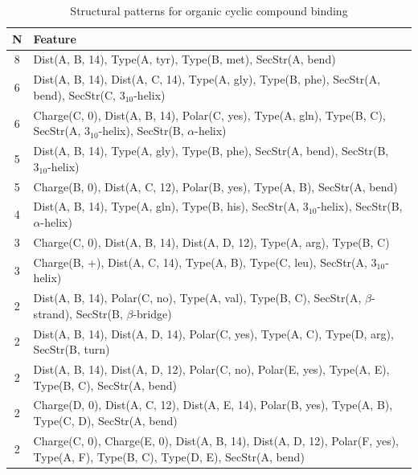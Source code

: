 \documentclass[11pt,twoside,a4paper]{book}
\begin{document}
\begin{table}\begin{tabularx}{\textwidth}{cX}\textbf{N} & \textbf{Feature} \\ \hline  
8 & Dist(A, B, 14),  Type(A, tyr), Type(B, met), SecStr(A, bend)\\ \hline 
6 & Dist(A, B, 14), Dist(A, C, 14),  Type(A, gly), Type(B, phe), SecStr(A, bend), \newline SecStr(C, $3_{10}$-helix)\\ \hline 
6 & Charge(C, 0), Dist(A, B, 14), Polar(C, yes),  Type(A, gln), Type(B, C), \newline SecStr(A, $3_{10}$-helix), SecStr(B, $\alpha$-helix)\\ \hline 
5 & Dist(A, B, 14),  Type(A, gly), Type(B, phe), SecStr(A, bend), SecStr(B, $3_{10}$-helix)\\ \hline 
5 & Charge(B, 0), Dist(A, C, 12), Polar(B, yes),   Type(A, B), SecStr(A, bend)\\ \hline 
4 & Dist(A, B, 14),  Type(A, gln), Type(B, his), SecStr(A, $3_{10}$-helix), SecStr(B, $\alpha$-helix)\\ \hline 
3 & Charge(C, 0), Dist(A, B, 14), Dist(A, D, 12),   Type(A, arg), Type(B, C)\\ \hline 
3 & Charge(B, +), Dist(A, C, 14),  Type(A, B), Type(C, leu), SecStr(A, $3_{10}$-helix)\\ \hline 
2 & Dist(A, B, 14), Polar(C, no),  Type(A, val), Type(B, C), SecStr(A, $\beta$-strand), \newline SecStr(B, $\beta$-bridge)\\ \hline 
2 & Dist(A, B, 14), Dist(A, D, 14), Polar(C, yes),  Type(A, C), Type(D, arg), \newline SecStr(B, turn)\\ \hline 
2 & Dist(A, B, 14), Dist(A, D, 12), Polar(C, no), Polar(E, yes),   Type(A, E), Type(B, C), SecStr(A, bend)\\ \hline 
2 & Charge(D, 0), Dist(A, C, 12), Dist(A, E, 14), Polar(B, yes),   Type(A, B), \newline Type(C, D), SecStr(A, bend)\\ \hline 
2 & Charge(C, 0), Charge(E, 0), Dist(A, B, 14), Dist(A, D, 12), Polar(F, yes),  \newline Type(A, F), Type(B, C), Type(D, E), SecStr(A, bend)\\ \hline 
 \end{tabularx}\caption{Structural patterns for organic cyclic compound binding}\label{tab:organic_cyclic_compound_binding}\end{table}
\end{document}

